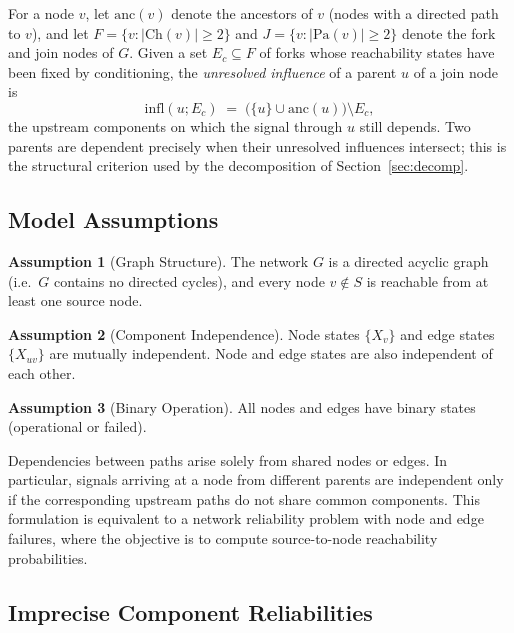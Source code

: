 \documentclass[preprint,12pt]{elsarticle}
\theoremstyle{definition}
\newtheorem{assumption}{Assumption}
\begin{document}
For a node $v$, let $\mathrm{anc}(v)$ denote the ancestors of $v$ (nodes with a directed path to $v$),
and let $F=\{v : |\mathrm{Ch}(v)|\ge 2\}$ and $J=\{v : |\mathrm{Pa}(v)|\ge 2\}$ denote the fork and join
nodes of $G$. Given a set $E_c\subseteq F$ of forks whose reachability states have been fixed by
conditioning, the \emph{unresolved influence} of a parent $u$ of a join node is
\begin{equation}\label{eq:infl}
\mathrm{infl}(u;E_c) \;=\; \bigl(\{u\}\cup\mathrm{anc}(u)\bigr)\setminus E_c ,
\end{equation}
the upstream components on which the signal through $u$ still depends. Two parents are dependent
precisely when their unresolved influences intersect; this is the structural criterion used by the
decomposition of Section~\ref{sec:decomp}.

\subsection{Model Assumptions}

\begin{assumption}[Graph Structure]
The network $G$ is a directed acyclic graph (i.e.\ $G$ contains no directed cycles), and every node
$v\notin S$ is reachable from at least one source node.
\end{assumption}

\begin{assumption}[Component Independence]\label{as:indep}
Node states $\{X_v\}$ and edge states $\{X_{uv}\}$ are mutually independent. Node and edge states are
also independent of each other.
\end{assumption}

\begin{assumption}[Binary Operation]
All nodes and edges have binary states (operational or failed).
\end{assumption}

Dependencies between paths arise solely from shared nodes or edges. In particular, signals arriving at a
node from different parents are independent only if the corresponding upstream paths do not share common
components. This formulation is equivalent to a network reliability problem with node and edge failures,
where the objective is to compute source-to-node reachability probabilities.

\subsection{Imprecise Component Reliabilities}\label{sec:imprecise_model}
\end{document}

